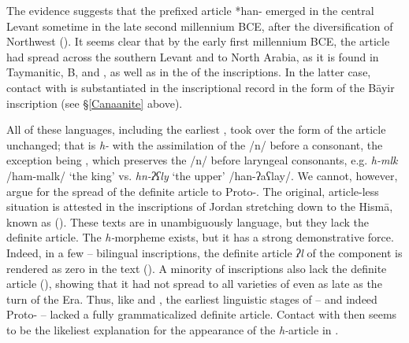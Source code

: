 \documentclass[output=paper]{langsci/langscibook}
\begin{document}
The evidence suggests that the prefixed {article} *han- emerged in the central Levant sometime in the late second millennium BCE, after the diversification of Northwest  (\citealt{Tropper2001,Gzella2006,Pat-El2006}). It seems clear that by the early first millennium BCE, the {article} had spread across the southern Levant and to North Arabia, as it is found in Taymanitic,  B, and , as well as in the   of the  inscriptions. In the latter case, contact with  is substantiated in the inscriptional record in the form of the Bāyir inscription (see §\ref{Canaanite} above). 

All of these languages, including the earliest  , took over the form of the {article} unchanged; that is \textit{h-} with the assimilation of the /n/ before a consonant, the exception being , which preserves the /n/ before laryngeal consonants, e.g. \textit{h-mlk} /ham-malk/ ‘the king’ vs. \textit{hn-ʔʕly} ‘the upper’ /han-ʔaʕlay/. We cannot, however, argue for the spread of the {definite} {article} to Proto-. The original, article-less situation is attested in the inscriptions of  Jordan stretching down to the Hismā, known as  (\citealt{GrafZwettler2004}). These texts are in unambiguously  language, but they lack the {definite} {article}. The \textit{h-}morpheme exists, but it has a strong demonstrative force. Indeed, in a few -- bilingual inscriptions, the {definite} {article} \textit{ʔl} of the  component is rendered as zero in the  text (\citealt{Hayajneh2009}). A minority of  inscriptions also lack the {definite} {article} (\citealt{Al-Jallad2018ANA}), showing that it had not spread to all varieties of  even as late as the turn of the Era. Thus, like  and , the earliest linguistic stages of  – and indeed Proto- – lacked a fully grammaticalized {definite} {article}. Contact with  then seems to be the likeliest explanation for the appearance of the \textit{h-}{article} in  .
\end{document}
